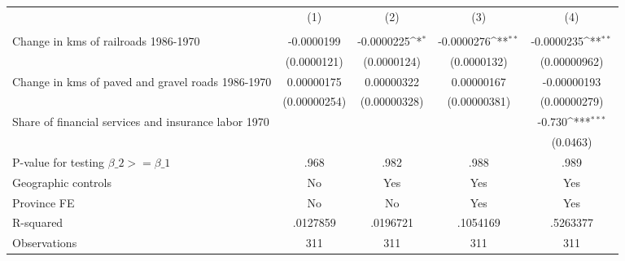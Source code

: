 {
\def\sym#1{\ifmmode^{#1}\else\(^{#1}\)\fi}
\begin{tabular}{l*{4}{c}}
\hline\hline
                &\multicolumn{1}{c}{(1)}&\multicolumn{1}{c}{(2)}&\multicolumn{1}{c}{(3)}&\multicolumn{1}{c}{(4)}\\
                &\multicolumn{1}{c}{}&\multicolumn{1}{c}{}&\multicolumn{1}{c}{}&\multicolumn{1}{c}{}\\
\hline
Change in kms of railroads 1986-1970&-0.0000199         &-0.0000225\sym{*}  &-0.0000276\sym{**} &-0.0000235\sym{**} \\
                &(0.0000121)         &(0.0000124)         &(0.0000132)         &(0.00000962)         \\
[1em]
Change in kms of paved and gravel roads 1986-1970&0.00000175         &0.00000322         &0.00000167         &-0.00000193         \\
                &(0.00000254)         &(0.00000328)         &(0.00000381)         &(0.00000279)         \\
[1em]
Share of financial services and insurance labor 1970&                  &                  &                  &   -0.730\sym{***}\\
                &                  &                  &                  & (0.0463)         \\
\hline
P-value for testing $\beta\_{2} >= \beta\_{1}$&     .968         &     .982         &     .988         &     .989         \\
Geographic controls&       No         &      Yes         &      Yes         &      Yes         \\
Province FE     &       No         &       No         &      Yes         &      Yes         \\
R-squared       & .0127859         & .0196721         & .1054169         & .5263377         \\
Observations    &      311         &      311         &      311         &      311         \\
\hline\hline
\end{tabular}
}
